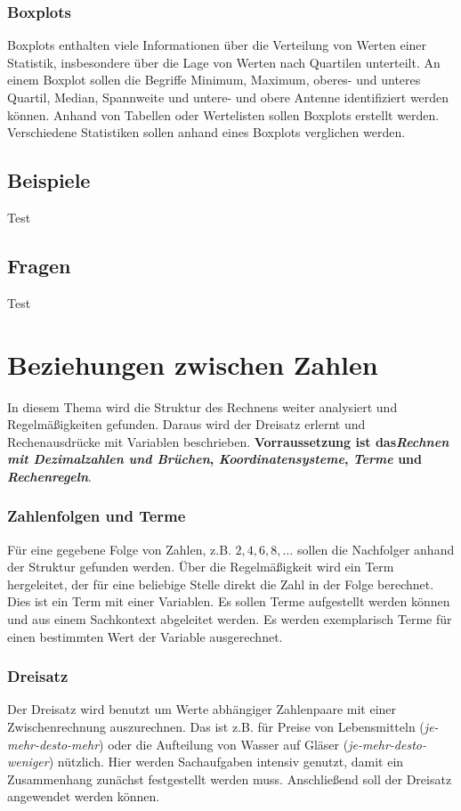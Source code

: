 \documentclass{article}
\begin{document}
\subsubsection*{Boxplots}
Boxplots enthalten viele Informationen über die Verteilung von Werten einer Statistik, insbesondere über die Lage von Werten nach Quartilen unterteilt.
An einem Boxplot sollen die Begriffe Minimum, Maximum, oberes- und unteres Quartil, Median, Spannweite und untere- und obere Antenne identifiziert werden können.
Anhand von Tabellen oder Wertelisten sollen Boxplots erstellt werden.
Verschiedene Statistiken sollen anhand eines Boxplots verglichen werden.
\subsection{Beispiele}
\begin{tcolorbox}[colback=gray!5!white,colframe=gray!25!black]
Test
\end{tcolorbox}
\subsection{Fragen}
\begin{tcolorbox}[colback=blue!5!white,colframe=blue!25!black]
Test
\end{tcolorbox}
\newpage
\section{Beziehungen zwischen Zahlen}
In diesem Thema wird die Struktur des Rechnens weiter analysiert und Regelmäßigkeiten gefunden. Daraus wird der Dreisatz erlernt und Rechenausdrücke mit Variablen beschrieben.
\textbf{Vorraussetzung ist das\textit{Rechnen mit Dezimalzahlen und Brüchen}, \textit{Koordinatensysteme}, \textit{Terme} und \textit{Rechenregeln}}.
\subsubsection*{Zahlenfolgen und Terme}
Für eine gegebene Folge von Zahlen, z.B. $2,4,6,8,\ldots$ sollen die Nachfolger anhand der Struktur gefunden werden. 
Über die Regelmäßigkeit wird ein Term hergeleitet, der für eine beliebige Stelle direkt die Zahl in der Folge berechnet. Dies ist ein Term mit einer Variablen.
Es sollen Terme aufgestellt werden können und aus einem Sachkontext abgeleitet werden. Es werden exemplarisch Terme für einen bestimmten Wert der Variable ausgerechnet.
\subsubsection*{Dreisatz}
Der Dreisatz wird benutzt um Werte abhängiger Zahlenpaare mit einer Zwischenrechnung auszurechnen. Das ist z.B. für Preise von Lebensmitteln (\textit{je-mehr-desto-mehr}) oder die Aufteilung von Wasser auf Gläser (\textit{je-mehr-desto-weniger}) nützlich.
Hier werden Sachaufgaben intensiv genutzt, damit ein Zusammenhang zunächst festgestellt werden muss. Anschließend soll der Dreisatz angewendet werden können.
\end{document}
